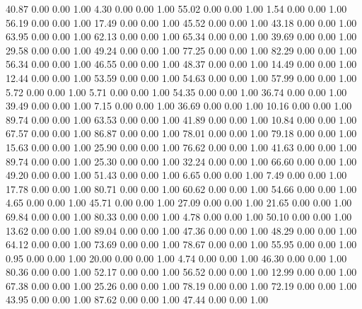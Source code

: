    40.87   0.00   0.00   1.00
    4.30   0.00   0.00   1.00
   55.02   0.00   0.00   1.00
    1.54   0.00   0.00   1.00
   56.19   0.00   0.00   1.00
   17.49   0.00   0.00   1.00
   45.52   0.00   0.00   1.00
   43.18   0.00   0.00   1.00
   63.95   0.00   0.00   1.00
   62.13   0.00   0.00   1.00
   65.34   0.00   0.00   1.00
   39.69   0.00   0.00   1.00
   29.58   0.00   0.00   1.00
   49.24   0.00   0.00   1.00
   77.25   0.00   0.00   1.00
   82.29   0.00   0.00   1.00
   56.34   0.00   0.00   1.00
   46.55   0.00   0.00   1.00
   48.37   0.00   0.00   1.00
   14.49   0.00   0.00   1.00
   12.44   0.00   0.00   1.00
   53.59   0.00   0.00   1.00
   54.63   0.00   0.00   1.00
   57.99   0.00   0.00   1.00
    5.72   0.00   0.00   1.00
    5.71   0.00   0.00   1.00
   54.35   0.00   0.00   1.00
   36.74   0.00   0.00   1.00
   39.49   0.00   0.00   1.00
    7.15   0.00   0.00   1.00
   36.69   0.00   0.00   1.00
   10.16   0.00   0.00   1.00
   89.74   0.00   0.00   1.00
   63.53   0.00   0.00   1.00
   41.89   0.00   0.00   1.00
   10.84   0.00   0.00   1.00
   67.57   0.00   0.00   1.00
   86.87   0.00   0.00   1.00
   78.01   0.00   0.00   1.00
   79.18   0.00   0.00   1.00
   15.63   0.00   0.00   1.00
   25.90   0.00   0.00   1.00
   76.62   0.00   0.00   1.00
   41.63   0.00   0.00   1.00
   89.74   0.00   0.00   1.00
   25.30   0.00   0.00   1.00
   32.24   0.00   0.00   1.00
   66.60   0.00   0.00   1.00
   49.20   0.00   0.00   1.00
   51.43   0.00   0.00   1.00
    6.65   0.00   0.00   1.00
    7.49   0.00   0.00   1.00
   17.78   0.00   0.00   1.00
   80.71   0.00   0.00   1.00
   60.62   0.00   0.00   1.00
   54.66   0.00   0.00   1.00
    4.65   0.00   0.00   1.00
   45.71   0.00   0.00   1.00
   27.09   0.00   0.00   1.00
   21.65   0.00   0.00   1.00
   69.84   0.00   0.00   1.00
   80.33   0.00   0.00   1.00
    4.78   0.00   0.00   1.00
   50.10   0.00   0.00   1.00
   13.62   0.00   0.00   1.00
   89.04   0.00   0.00   1.00
   47.36   0.00   0.00   1.00
   48.29   0.00   0.00   1.00
   64.12   0.00   0.00   1.00
   73.69   0.00   0.00   1.00
   78.67   0.00   0.00   1.00
   55.95   0.00   0.00   1.00
    0.95   0.00   0.00   1.00
   20.00   0.00   0.00   1.00
    4.74   0.00   0.00   1.00
   46.30   0.00   0.00   1.00
   80.36   0.00   0.00   1.00
   52.17   0.00   0.00   1.00
   56.52   0.00   0.00   1.00
   12.99   0.00   0.00   1.00
   67.38   0.00   0.00   1.00
   25.26   0.00   0.00   1.00
   78.19   0.00   0.00   1.00
   72.19   0.00   0.00   1.00
   43.95   0.00   0.00   1.00
   87.62   0.00   0.00   1.00
   47.44   0.00   0.00   1.00
